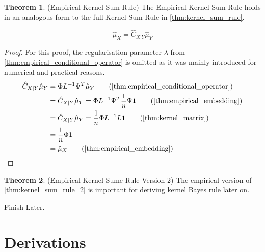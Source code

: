 \documentclass[twoside]{article} \usepackage{aistats2017}
\theoremstyle{definition}
\newtheorem{theorem}{Theorem}[section]
\newcommand{\rv}[1]{{#1}}
\newcommand{\warn}[1]{{\color{red} #1}}
\newcommand{\extra}[1]{{\color{ForestGreen} #1}}
\newcommand{\hatmuX}{\hat{\mu}_{\rv{X}}}
\newcommand{\hatmuY}{\hat{\mu}_{\rv{Y}}}
\newcommand{\hatCxly}{\hat{C}_{\rv{X} | \rv{Y}}}
\begin{document}
		\extra{
		\begin{theorem} \label{thm:empirical_kernel_sum_rule}
			(Empirical Kernel Sum Rule)
			The Empirical Kernel Sum Rule holds in an analogous form to the full Kernel Sum Rule in \cref{thm:kernel_sum_rule}.
			
			\begin{equation}
				\hatmuX = \hatCxly \hatmuY
			\label{eq:empirical_kernel_sum_rule}
			\end{equation}
			
			\begin{proof}
				For this proof, the regularisation parameter $\lambda$ from \cref{thm:empirical_conditional_operator} is omitted as it was mainly introduced for numerical and practical reasons.
				\begin{align*}
					\hatCxly \hatmuY &= \Phi L^{-1} \Psi^{T} \hatmuY \tag{\cref{thm:empirical_conditional_operator}} \\
					&= \hatCxly \hatmuY = \Phi L^{-1} \Psi^{T} \frac{1}{n} \Psi \bvec{1} \tag{\cref{thm:empirical_embedding}} \\
					&= \hatCxly \hatmuY =  \frac{1}{n} \Phi L^{-1} L \bvec{1} \tag{\cref{thm:kernel_matrix}} \\
					&=  \frac{1}{n} \Phi \bvec{1} \\
					&= \hatmuX \tag{\cref{thm:empirical_embedding}}
				\end{align*}
			\end{proof}
		\end{theorem}
		
		\begin{theorem} \label{thm:empirical_kernel_sum_rule_2}
			(Empirical Kernel Sume Rule Version 2) The empirical version of \cref{thm:kernel_sum_rule_2} is important for deriving kernel Bayes rule later on.
		\end{theorem}
		}
		\warn{Finish Later.}

\section{Derivations}
\end{document}

